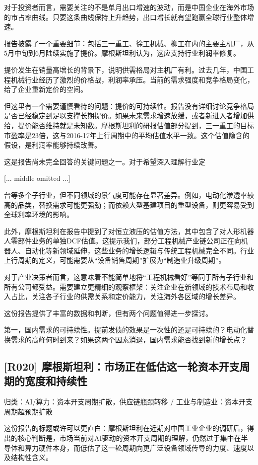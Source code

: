\documentclass[11pt]{ctexart}
\begin{document}
对于投资者而言，需要关注的不是单月出口增速的波动，而是中国企业在海外市场的市占率曲线。只要这条曲线保持上升趋势，出口增长就有望跑赢全球行业整体增速。

报告披露了一个重要细节：包括三一重工、徐工机械、柳工在内的主要主机厂，从5月中旬到6月陆续实施了提价。摩根斯坦利认为，这应支持行业利润率修复。

提价发生在销量高增长的背景下，说明供需格局对主机厂有利。过去几年，中国工程机械行业经历了激烈的价格战，利润率承压。当前的需求强度和竞争格局变化，给了企业重新定价的空间。

但这里有一个需要谨慎看待的问题：提价的可持续性。报告没有详细讨论竞争格局是否已经稳定到足以支撑长期提价。如果未来需求增速放缓，或者新进入者增加供给，提价能否维持就是未知数。摩根斯坦利的研报估值部分提到，三一重工的目标市盈率是23倍，这与2016-17年上行周期中的平均估值水平一致。这个估值隐含的假设，是利润率能够持续改善。

这是报告尚未完全回答的关键问题之一。对于希望深入理解行业定

[... middle omitted ...]

台等多个子行业，但不同领域的景气度可能存在显著差异。例如，电动化渗透率较高的品类，替换需求可能更强劲；而依赖大型基建项目的重型设备，则更容易受到全球利率环境的影响。

此外，摩根斯坦利在报告中提到了对恒立液压的估值方法，其中包含了对人形机器人零部件业务的单独DCF估值。这提示我们，部分工程机械产业链公司正在向机器人、自动化等新领域延伸，这些业务的增长逻辑与传统工程机械完全不同。行业上行周期的定义，可能需要从“设备销售周期”扩展为“制造业升级周期”。

对于产业决策者而言，这意味着不能简单地将“工程机械看好”等同于所有子行业和所有公司都受益。需要建立更精细的观察框架：关注企业在新领域的技术布局和收入占比，关注各子行业的供需关系和定价能力，关注海外各区域的增长差异。

这份报告提供了丰富的数据和判断，但有两个问题值得进一步探讨。

第一，国内需求的可持续性。提前发债的效果是一次性的还是可持续的？电动化替换需求的高峰何时到来？如果这两个因素消退，国内需求能否找到新的增长点？

\subsection{[R020] 摩根斯坦利：市场正在低估这一轮资本开支周期的宽度和持续性}
{\small\color{refgray}归类：AI/算力：资本开支周期扩散，供应链瓶颈转移 / 工业与制造业：资本开支周期超预期扩散}

这份报告的标题或许可以更直白：摩根斯坦利在近期对中国工业企业的调研后，得出的核心判断是，市场当前对AI驱动的资本开支周期的理解，仍然过于集中在半导体和算力硬件本身，而低估了这一轮周期向更广泛设备领域传导的力度、速度以及结构性含义。
\end{document}
